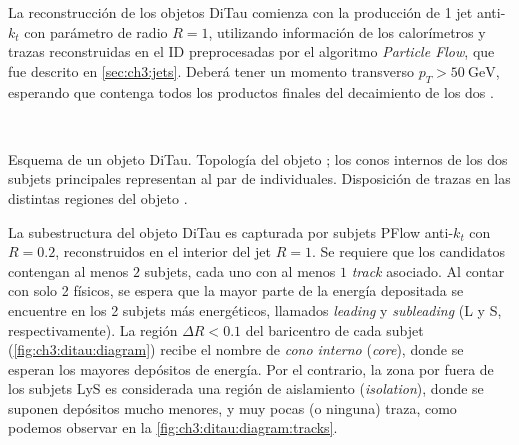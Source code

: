 La reconstrucción de los objetos DiTau comienza con la producción de 1 jet anti-$k_t$ con parámetro de radio $R = 1$, utilizando información de los calorímetros y trazas reconstruidas en el ID preprocesadas por el algoritmo \textit{Particle Flow}, que fue descrito en \ref{sec:ch3:jets}. Deberá tener un momento transverso $p_T > \SI{50}{\GeV}$, esperando que contenga todos los productos finales del decaimiento de los dos \thad.

\begin{marginfigure}[12em]
    \\
    \caption[Esquema de un objeto DiTau: topología y disposición de trazas]{Esquema de un objeto DiTau. Topología del objeto ; los conos internos de los dos subjets principales representan al par de \thads individuales. Disposición de trazas en las distintas regiones del objeto .}
    \label{fig:ch3:ditau:diagram}
\end{marginfigure}

La subestructura del objeto DiTau es capturada por subjets PFlow anti-$k_t$ con $R = 0.2$, reconstruidos en el interior del jet $R = 1$. Se requiere que los candidatos contengan al menos $2$ subjets, cada uno con al menos $1$ \textit{track} asociado. Al contar con solo 2 \thad físicos, se espera que la mayor parte de la energía depositada se encuentre en los 2 subjets más energéticos, llamados \textit{leading} y \textit{subleading} (L y S, respectivamente). La región $\Delta R < 0.1$ del baricentro de cada subjet (\cref{fig:ch3:ditau:diagram}) recibe el nombre de \textit{cono interno} (\textit{core}), donde se esperan los mayores depósitos de energía. Por el contrario, la zona por fuera de los subjets LyS es considerada una región de aislamiento (\textit{isolation}), donde se suponen depósitos mucho menores, y muy pocas (o ninguna) traza, como podemos observar en la \cref{fig:ch3:ditau:diagram:tracks}.

